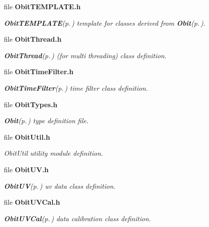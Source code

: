 \begin{CompactItemize}
\item 
file {\bf Obit\-TEMPLATE.h}
\begin{CompactList}\small\item\em {\bf Obit\-TEMPLATE}{\rm (p.\,\pageref{structObitTEMPLATE})} template for classes derived from {\bf Obit}{\rm (p.\,\pageref{structObit})}. \item\end{CompactList}

\item 
file {\bf Obit\-Thread.h}
\begin{CompactList}\small\item\em {\bf Obit\-Thread}{\rm (p.\,\pageref{structObitThread})} (for multi threading) class definition. \item\end{CompactList}

\item 
file {\bf Obit\-Time\-Filter.h}
\begin{CompactList}\small\item\em {\bf Obit\-Time\-Filter}{\rm (p.\,\pageref{structObitTimeFilter})} time filter class definition. \item\end{CompactList}

\item 
file {\bf Obit\-Types.h}
\begin{CompactList}\small\item\em {\bf Obit}{\rm (p.\,\pageref{structObit})} type definition file. \item\end{CompactList}

\item 
file {\bf Obit\-Util.h}
\begin{CompactList}\small\item\em Obit\-Util utility module definition. \item\end{CompactList}

\item 
file {\bf Obit\-UV.h}
\begin{CompactList}\small\item\em {\bf Obit\-UV}{\rm (p.\,\pageref{structObitUV})} uv data class definition. \item\end{CompactList}

\item 
file {\bf Obit\-UVCal.h}
\begin{CompactList}\small\item\em {\bf Obit\-UVCal}{\rm (p.\,\pageref{structObitUVCal})} data calibration class definition. \item\end{CompactList}


\end{CompactItemize}
